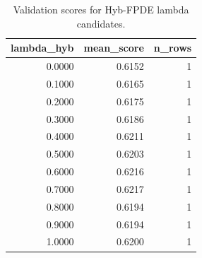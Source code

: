 \begin{table}[t]
\caption{Validation scores for Hyb-FPDE lambda candidates.}
\label{tab:lambda_distribution_computed}
\centering
\begin{tabular}{rrr}
\toprule
lambda\_hyb & mean\_score & n\_rows \\
\midrule
0.0000 & 0.6152 & 1 \\
0.1000 & 0.6165 & 1 \\
0.2000 & 0.6175 & 1 \\
0.3000 & 0.6186 & 1 \\
0.4000 & 0.6211 & 1 \\
0.5000 & 0.6203 & 1 \\
0.6000 & 0.6216 & 1 \\
0.7000 & 0.6217 & 1 \\
0.8000 & 0.6194 & 1 \\
0.9000 & 0.6194 & 1 \\
1.0000 & 0.6200 & 1 \\
\bottomrule
\end{tabular}

\end{table}
